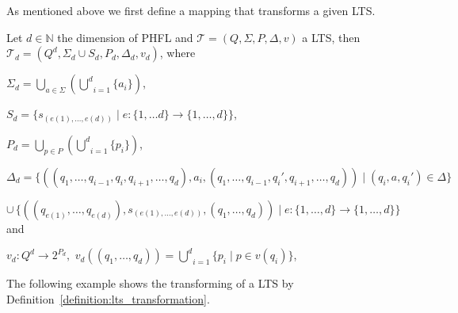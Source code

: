 As mentioned above we first define a mapping that transforms a given LTS.

\begin{definition}
    \label{definition:lts_transformation}
    Let $d \in \mathbb{N}$ the dimension of PHFL and $\mathcal{T} = (Q, \Sigma, P, \Delta, v)$ a LTS, then
    $\mathcal{T}_d = (Q^d, \Sigma_d \cup S_d, P_d, \Delta_d, v_d)$, where
    \begin{compactitem}
        \item $\Sigma_d = \underset{a \in \Sigma}{\bigcup}(\underset{i = 1}{\overset{d}{\bigcup}} \{a_i\})$,
        \item $S_d = \{s_{(e(1), \dots, e(d))} \mid e: \{1, \dots d\} \rightarrow \{1, \dots, d\}\}$,
        \item $P_d = \underset{p \in P}{\bigcup}(\underset{i = 1}{\overset{d}{\bigcup}} \{p_i\})$,
        \item $\Delta_d = \{((q_1, \dots ,q_{i - 1}, q_i, q_{i + 1}, \dots, q_d), a_i, (q_1, \dots ,q_{i - 1},
        {q_i}', q_{i + 1}, \dots, q_d)) \mid (q_i, a, {q_i}') \in \Delta\}$

        $\cup\,\{((q_{e(1)}, \dots, q_{e(d)}), s_{(e(1),
        \dots, e(d))}, (q_1, \dots, q_d)) \mid e: \{1, \dots, d\} \rightarrow \{1, \dots, d\}\}$ and
        \item $v_d \colon Q^d \rightarrow 2^{P_d}, $
        $v_d((q_1, \dots, q_d)) = \underset{i = 1}{\overset{d}{\bigcup}} \{p_i \mid p \in v(q_i)\}$,
    \end{compactitem}
\end{definition}

The following example shows the transforming of a LTS by Definition~\ref{definition:lts_transformation}.

